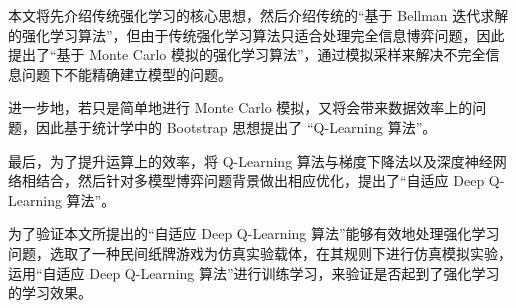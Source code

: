 本文将先介绍传统强化学习的核心思想，然后介绍传统的“基于 Bellman 迭代求解的强化学习算法”，但由于传统强化学习算法只适合处理完全信息博弈问题，因此提出了“基于 Monte Carlo 模拟的强化学习算法”，通过模拟采样来解决不完全信息问题下不能精确建立模型的问题。

进一步地，若只是简单地进行 Monte Carlo 模拟，又将会带来数据效率上的问题，因此基于统计学中的 Bootstrap 思想提出了 “Q-Learning 算法”。

最后，为了提升运算上的效率，将 Q-Learning 算法与梯度下降法以及深度神经网络相结合\cite{mnih2013playing}，然后针对多模型博弈问题背景做出相应优化，提出了“自适应 Deep Q-Learning 算法”。

为了验证本文所提出的“自适应 Deep Q-Learning 算法”能够有效地处理强化学习问题，选取了一种民间纸牌游戏为仿真实验载体，在其规则下进行仿真模拟实验，运用“自适应 Deep Q-Learning 算法”进行训练学习，来验证是否起到了强化学习的学习效果。